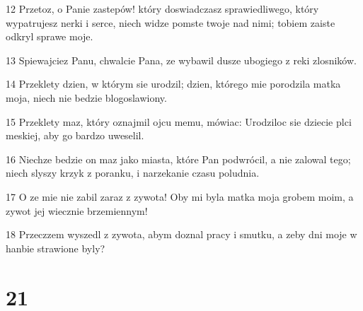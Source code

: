 \par 12 Przetoz, o Panie zastepów! który doswiadczasz sprawiedliwego, który wypatrujesz nerki i serce, niech widze pomste twoje nad nimi; tobiem zaiste odkryl sprawe moje.
\par 13 Spiewajciez Panu, chwalcie Pana, ze wybawil dusze ubogiego z reki zlosników.
\par 14 Przeklety dzien, w którym sie urodzil; dzien, którego mie porodzila matka moja, niech nie bedzie blogoslawiony.
\par 15 Przeklety maz, który oznajmil ojcu memu, mówiac: Urodziloc sie dziecie plci meskiej, aby go bardzo uweselil.
\par 16 Niechze bedzie on maz jako miasta, które Pan podwrócil, a nie zalowal tego; niech slyszy krzyk z poranku, i narzekanie czasu poludnia.
\par 17 O ze mie nie zabil zaraz z zywota! Oby mi byla matka moja grobem moim, a zywot jej wiecznie brzemiennym!
\par 18 Przeczzem wyszedl z zywota, abym doznal pracy i smutku, a zeby dni moje w hanbie strawione byly?

\chapter{21}

